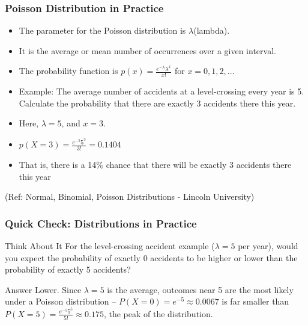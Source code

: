 \begin{frame}
\frametitle{Poisson Distribution in Practice}
\begin{itemize}
\item The parameter for the Poisson distribution is $\lambda$(lambda). 
\item It is the average or mean
number of occurrences over a given interval.
\item The probability function is $p(x) = \frac{e^{-\lambda}\lambda^x}{x!}$ for $x=0,1,2,\ldots$
\item Example: The average number of accidents at a level-crossing every year
is 5. Calculate the probability that there are exactly 3 accidents
there this year.
\item Here, $\lambda = 5$, and $x = 3$.
\item $p(X=3) = \frac{e^{-5}5^3}{3!} = 0.1404$
\item That is, there is a 14\% chance that there will be exactly 3 accidents there this year
\end{itemize}


{\tiny (Ref: Normal, Binomial, Poisson Distributions -  Lincoln University)}
\end{frame}

\begin{frame}[fragile]\frametitle{Quick Check: Distributions in Practice}
\begin{block}{Think About It}
For the level-crossing accident example ($\lambda=5$ per year), would you expect the probability of exactly 0 accidents to be higher or lower than the probability of exactly 5 accidents?
\end{block}
\pause
\begin{block}{Answer}
Lower. Since $\lambda=5$ is the average, outcomes near 5 are the most likely under a Poisson distribution -- $P(X=0) = e^{-5} \approx 0.0067$ is far smaller than $P(X=5) = \frac{e^{-5}5^5}{5!} \approx 0.175$, the peak of the distribution.
\end{block}
\end{frame}
